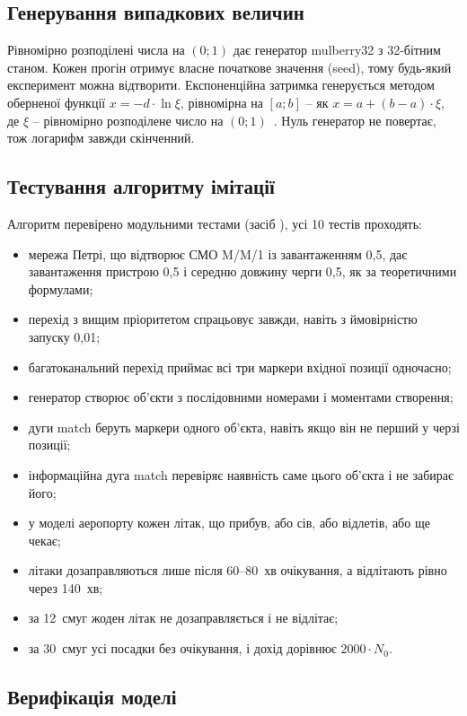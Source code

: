 \subsection{Генерування випадкових величин}

Рівномірно розподілені числа на $(0; 1)$ дає генератор mulberry32 з 32-бітним станом. Кожен прогін отримує власне початкове значення (seed), тому будь-який експеримент можна відтворити. Експоненційна затримка генерується методом оберненої функції $x = -d \cdot \ln \xi$, рівномірна на $[a; b]$ -- як $x = a + (b - a) \cdot \xi$, де $\xi$ -- рівномірно розподілене число на $(0; 1)$~\cite{stetsenko2010}. Нуль генератор не повертає, тож логарифм завжди скінченний.

\subsection{Тестування алгоритму імітації}

Алгоритм перевірено модульними тестами (засіб ), усі 10 тестів проходять:
\begin{itemize}
\item мережа Петрі, що відтворює СМО M/M/1 із завантаженням 0,5, дає завантаження пристрою 0,5 і середню довжину черги 0,5, як за теоретичними формулами;
\item перехід з вищим пріоритетом спрацьовує завжди, навіть з ймовірністю запуску 0,01;
\item багатоканальний перехід приймає всі три маркери вхідної позиції одночасно;
\item генератор створює об'єкти з послідовними номерами і моментами створення;
\item дуги match беруть маркери одного об'єкта, навіть якщо він не перший у черзі позиції;
\item інформаційна дуга match перевіряє наявність саме цього об'єкта і не забирає його;
\item у моделі аеропорту кожен літак, що прибув, або сів, або відлетів, або ще чекає;
\item літаки дозаправляються лише після 60--80~хв очікування, а відлітають рівно через 140~хв;
\item за 12~смуг жоден літак не дозаправляється і не відлітає;
\item за 30~смуг усі посадки без очікування, і дохід дорівнює $2000 \cdot N_0$.
\end{itemize}

\subsection{Верифікація моделі}

